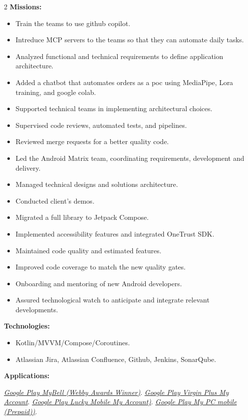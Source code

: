 \documentclass[10pt,a4paper,withhyper]{altacv}
\begin{document}
\begin{paracol}{2}
\textbf{Missions:}
\begin{itemize}
\addtolength{\itemindent}{0.1cm}
\item Train the teams to use github copilot.
\item Intreduce MCP servers to the teams so that they can automate daily tasks.
\item Analyzed functional and technical requirements to define application architecture.
\item Added a chatbot that automates orders as a poc using MediaPipe, Lora training, and google colab.
\item Supported technical teams in implementing architectural choices.
\item Supervised code reviews, automated tests, and pipelines.
\item Reviewed merge requests for a better quality code.
\item Led the Android Matrix team, coordinating requirements, development and delivery.
\item Managed technical designs and solutions architecture.
\item Conducted client’s demos.
\item Migrated a full library to Jetpack Compose.
\item Implemented accessibility features and integrated OneTrust SDK.
\item Maintained code quality and estimated features.
\item Improved code coverage to match the new quality gates.
\item Onboarding and mentoring of new Android developers.
\item Assured technological watch to anticipate and integrate relevant developments.
\end{itemize}

\textbf{Technologies:}

\begin{itemize}
\addtolength{\itemindent}{0.1cm}
\item Kotlin/MVVM/Compose/Coroutines.
\item Atlassian Jira, Atlassian Confluence, Github, Jenkins, SonarQube.

\end{itemize}

\textbf{Applications:}

\href{https://play.google.com/store/apps/details?id=ca.bell.selfserve.mybellmobile&hl=en&gl=CA&pli=1}{\textit{Google Play MyBell (Webby Awards Winner)}}.
\newline
\href{https://play.google.com/store/apps/details?id=ca.virginmobile.myaccount.virginmobile&hl=en}{\textit{Google Play Virgin Plus My Account}}.
\newline
\href{https://play.google.com/store/apps/details?id=ca.luckymobile&hl=en}{\textit{Google Play Lucky Mobile My Account)}}.
\newline
\href{https://play.google.com/store/apps/details?id=ca.pcmobile.selfserve.mypcmobile&hl=en}{\textit{Google Play My PC mobile (Prepaid))}}.


\end{paracol}
\end{document}
